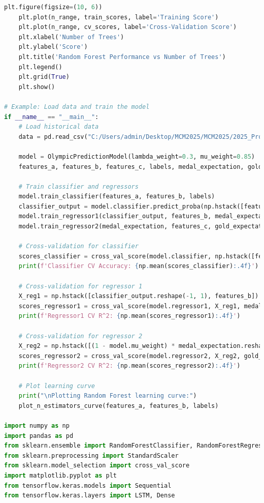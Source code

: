 \documentclass[12pt]{article}
\begin{document}
\begin{lstlisting}[language=Python, style=mystyle, caption=model.ipynb]
    plt.figure(figsize=(10, 6))
    plt.plot(n_range, train_scores, label='Training Score')
    plt.plot(n_range, cv_scores, label='Cross-Validation Score')
    plt.xlabel('Number of Trees')
    plt.ylabel('Score')
    plt.title('Random Forest Performance vs Number of Trees')
    plt.legend()
    plt.grid(True)
    plt.show()

# Example: Load data and train the model
if __name__ == "__main__":
    # Load historical data
    data = pd.read_csv("C:/Users/admin/Desktop/MCM2025/MCM2025/2025_Problem_C_Data/feature_Noc.csv")

    model = OlympicPredictionModel(lambda_weight=0.3, mu_weight=0.85)
    features_a, features_b, features_c, labels, medal_expectation, gold_expectation = model.preprocess_data(data)

    # Train classifier and regressors
    model.train_classifier(features_a, features_b, labels)
    classifier_output = model.classifier.predict_proba(np.hstack([features_a, features_b]))[:, 1]
    model.train_regressor1(classifier_output, features_b, medal_expectation)
    model.train_regressor2(medal_expectation, features_c, gold_expectation)

    # Cross-validation for classifier
    scores_classifier = cross_val_score(model.classifier, np.hstack([features_a, features_b]), labels, cv=5)
    print(f'Classifier CV Accuracy: {np.mean(scores_classifier):.4f}')

    # Cross-validation for regressor 1
    X_reg1 = np.hstack([classifier_output.reshape(-1, 1), features_b])
    scores_regressor1 = cross_val_score(model.regressor1, X_reg1, medal_expectation, cv=5)
    print(f'Regressor1 CV R^2: {np.mean(scores_regressor1):.4f}')

    # Cross-validation for regressor 2
    X_reg2 = np.hstack([(1 - model.mu_weight) * medal_expectation.reshape(-1, 1), model.mu_weight * features_c])
    scores_regressor2 = cross_val_score(model.regressor2, X_reg2, gold_expectation, cv=5)
    print(f'Regressor2 CV R^2: {np.mean(scores_regressor2):.4f}')

    # Plot learning curve
    print("\nPlotting Random Forest learning curve:")
    plot_n_estimators_curve(features_a, features_b, labels)

import numpy as np
import pandas as pd
from sklearn.ensemble import RandomForestClassifier, RandomForestRegressor
from sklearn.preprocessing import StandardScaler
from sklearn.model_selection import cross_val_score
import matplotlib.pyplot as plt
from tensorflow.keras.models import Sequential
from tensorflow.keras.layers import LSTM, Dense


\end{lstlisting}
\end{document}
